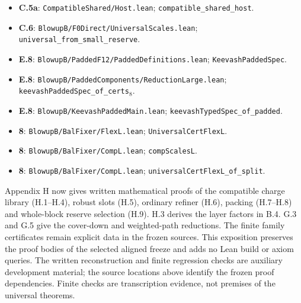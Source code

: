 \documentclass[english,11pt,a4paper]{article}
\begin{document}
\begin{itemize}
\item
  \textbf{C.5a}: \texttt{Compatible\allowbreak{}Sh\allowbreak{}ared/\allowbreak{}Host.\allowbreak{}le\allowbreak{}an}; \texttt{compatible\_\allowbreak{}s\allowbreak{}hared\_\allowbreak{}host}.
\item
  \textbf{C.6}: \texttt{Blowup\allowbreak{}B/\allowbreak{}F0Di\allowbreak{}rect/\allowbreak{}Univers\allowbreak{}al\allowbreak{}Scales.\allowbreak{}lea\allowbreak{}n}; \texttt{universal\_\allowbreak{}fr\allowbreak{}om\_\allowbreak{}small\_\allowbreak{}res\allowbreak{}erve}.
\item
  \textbf{E.8}: \texttt{Blowup\allowbreak{}B/\allowbreak{}Padd\allowbreak{}ed\allowbreak{}F12/\allowbreak{}Padded\allowbreak{}\allowbreak{}Definitions.\allowbreak{}\allowbreak{}lean}; \texttt{Keevash\allowbreak{}Padde\allowbreak{}d\allowbreak{}Spec}.
\item
  \textbf{E.8}: \texttt{Blowup\allowbreak{}B/\allowbreak{}Padd\allowbreak{}ed\allowbreak{}Components\allowbreak{}/\allowbreak{}Reduction\allowbreak{}La\allowbreak{}rge.\allowbreak{}lean}; \texttt{keevash\allowbreak{}Padde\allowbreak{}d\allowbreak{}Spec\_\allowbreak{}of\_\allowbreak{}cer\allowbreak{}ts\ensuremath{{}_{8}}}.
\item
  \textbf{E.8}: \texttt{Blowup\allowbreak{}B/\allowbreak{}Keev\allowbreak{}ash\allowbreak{}Padded\allowbreak{}Mai\allowbreak{}n.\allowbreak{}lean}; \texttt{keevash\allowbreak{}Typed\allowbreak{}\allowbreak{}Spec\_\allowbreak{}of\_\allowbreak{}padd\allowbreak{}ed}.
\item
  \textbf{8}: \texttt{Blowup\allowbreak{}B/\allowbreak{}Bal\allowbreak{}F\allowbreak{}ixer/\allowbreak{}Flex\allowbreak{}L.\allowbreak{}l\allowbreak{}ean}; \texttt{Universal\allowbreak{}Cer\allowbreak{}t\allowbreak{}Flex\allowbreak{}L}.
\item
  \textbf{8}: \texttt{Blowup\allowbreak{}B/\allowbreak{}Bal\allowbreak{}F\allowbreak{}ixer/\allowbreak{}Comp\allowbreak{}L.\allowbreak{}l\allowbreak{}ean}; \texttt{comp\allowbreak{}Scales\allowbreak{}L}.
\item
  \textbf{8}: \texttt{Blowup\allowbreak{}B/\allowbreak{}Bal\allowbreak{}F\allowbreak{}ixer/\allowbreak{}Comp\allowbreak{}L.\allowbreak{}l\allowbreak{}ean}; \texttt{universal\allowbreak{}Cer\allowbreak{}t\allowbreak{}Flex\allowbreak{}L\_\allowbreak{}of\_\allowbreak{}sp\allowbreak{}lit}.
\end{itemize}

Appendix H now gives written mathematical proofs of the compatible charge library (H.1--H.4), robust slots (H.5), ordinary refiner (H.6), packing (H.7--H.8) and whole-block reserve selection (H.9). H.3 derives the layer factors in B.4. G.3 and G.5 give the cover-down and weighted-path reductions. The finite family certificates remain explicit data in the frozen sources. This exposition preserves the proof bodies of the selected aligned freeze and adds no Lean build or axiom queries. The written reconstruction and finite regression checks are auxiliary development material; the source locations above identify the frozen proof dependencies. Finite checks are transcription evidence, not premises of the universal theorems.
\end{document}
